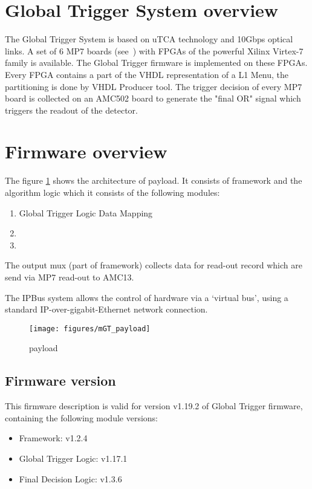 \section{Global Trigger System overview}\label{sec:gt_system}

The Global Trigger System is based on uTCA technology and 10Gbps optical links. A set of 6 MP7 boards (see~\cite{MP7}) with FPGAs of the powerful Xilinx Virtex-7 family is available. The Global Trigger firmware is implemented on these FPGAs. Every FPGA contains a part of the VHDL representation of a L1 Menu, the partitioning is done by VHDL Producer tool. The trigger decision of every MP7 board is collected on an AMC502 board to generate the "final OR" signal which triggers the readout of the detector.

\section{Firmware overview}\label{sec:fw}
The figure \ref{fig:mgt} shows the architecture of \ugt payload. It consists of framework and the algorithm logic which it consists of the following modules:
\begin{enumerate}
\item Global Trigger Logic Data Mapping
\item \ugtl
\item \ufdl
\end{enumerate}

The output mux (part of framework) collects data for read-out record which are send via MP7 read-out to AMC13.

The IPBus system allows the control of hardware via a ‘virtual bus’, using a standard IP-over-gigabit-Ethernet network connection.
\begin{figure}[h!]
   \centering
    \texttt{[image: figures/mGT\_payload]}
    \caption{\ugt payload}\label{fig:mgt}
 \end{figure}

\subsection{Firmware version}\label{sec:fw_version}

This firmware description is valid for version v1.19.2 of Global Trigger firmware, containing the following module versions:
\begin{itemize}
\item Framework: v1.2.4
\item Global Trigger Logic: v1.17.1
\item Final Decision Logic: v1.3.6
\end{itemize}

